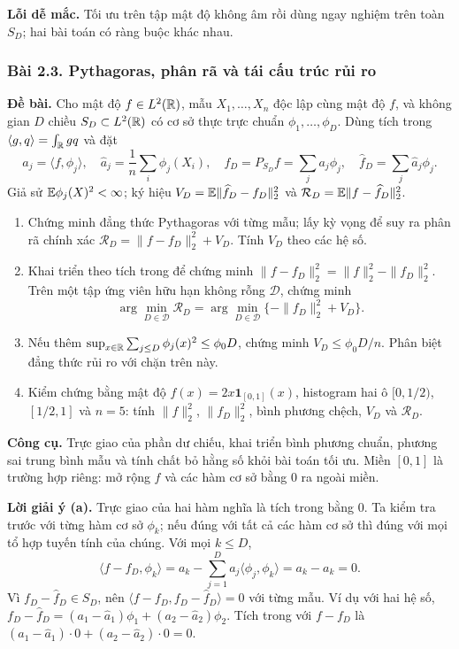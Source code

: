 \textbf{Lỗi dễ mắc.} Tối ưu trên tập mật độ không âm rồi dùng ngay nghiệm trên toàn $S_D$;
hai bài toán có ràng buộc khác nhau.

\subsubsection*{Bài 2.3. Pythagoras, phân rã và tái cấu trúc rủi ro}\label{ot45:pythagoras}
\textbf{Đề bài.} Cho mật độ $f\in L^2(\mathbb R)$, mẫu $X_1,\ldots,X_n$ độc lập cùng mật độ $f$,
và không gian $D$ chiều $S_D\subset L^2(\mathbb R)$ có cơ sở thực trực chuẩn
$\phi_1,\ldots,\phi_D$. Dùng tích trong $\langle g,q\rangle=\int_{\mathbb R}gq$ và đặt
\[
a_j=\langle f,\phi_j\rangle,\quad \widehat a_j=\frac1n\sum_i\phi_j(X_i),\quad
f_D=P_{S_D}f=\sum_ja_j\phi_j,\quad \widehat f_D=\sum_j\widehat a_j\phi_j.
\]
Giả sử $\mathbb E\phi_j(X)^2<\infty$; ký hiệu
$V_D=\mathbb E\|\widehat f_D-f_D\|_2^2$ và
$\mathcal R_D=\mathbb E\|f-\widehat f_D\|_2^2$.
\begin{enumerate}[label=(\alph*)]
\item Chứng minh đẳng thức Pythagoras với từng mẫu; lấy kỳ vọng để suy ra
phân rã chính xác $\mathcal R_D=\|f-f_D\|_2^2+V_D$. Tính $V_D$ theo các hệ số.
\item Khai triển theo tích trong để chứng minh
$\|f-f_D\|_2^2=\|f\|_2^2-\|f_D\|_2^2$.
Trên một tập ứng viên hữu hạn không rỗng $\mathcal D$, chứng minh
\[
\arg\min_{D\in\mathcal D}\mathcal R_D
=\arg\min_{D\in\mathcal D}\{-\|f_D\|_2^2+V_D\}.
\]
\item Nếu thêm $\sup_{x\in\mathbb R}\sum_{j\leq D}\phi_j(x)^2\leq\phi_0D$,
chứng minh $V_D\leq\phi_0D/n$. Phân biệt đẳng thức rủi ro với chặn trên này.
\item Kiểm chứng bằng mật độ $f(x)=2x\mathbf1_{[0,1]}(x)$,
histogram hai ô $[0,1/2)$, $[1/2,1]$ và $n=5$:
tính $\|f\|_2^2$, $\|f_D\|_2^2$, bình phương chệch, $V_D$ và $\mathcal R_D$.
\end{enumerate}

\textbf{Công cụ.} Trực giao của phần dư chiếu, khai triển bình phương chuẩn,
phương sai trung bình mẫu và tính chất bỏ hằng số khỏi bài toán tối ưu.
Miền $[0,1]$ là trường hợp riêng: mở rộng $f$ và các hàm cơ sở bằng 0 ra ngoài miền.

\textbf{Lời giải ý (a).}
Trực giao của hai hàm nghĩa là tích trong bằng 0.
Ta kiểm tra trước với từng hàm cơ sở $\phi_k$;
nếu đúng với tất cả các hàm cơ sở thì đúng với mọi tổ hợp tuyến tính của chúng.
Với mọi $k\leq D$,
\[
\langle f-f_D,\phi_k\rangle
=a_k-\sum_{j=1}^Da_j\langle\phi_j,\phi_k\rangle=a_k-a_k=0.
\]
Vì $f_D-\widehat f_D\in S_D$, nên
$\langle f-f_D,f_D-\widehat f_D\rangle=0$ với từng mẫu.
Ví dụ với hai hệ số, $f_D-\widehat f_D=(a_1-\widehat a_1)\phi_1
+(a_2-\widehat a_2)\phi_2$. Tích trong với $f-f_D$ là
$(a_1-\widehat a_1)\cdot0+(a_2-\widehat a_2)\cdot0=0$.

